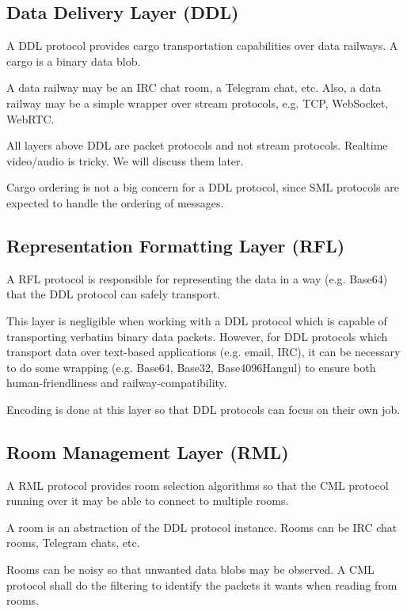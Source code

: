 \documentclass[a4paper,11pt]{article}
\begin{document}
\subsection{Data Delivery Layer (DDL)}

A DDL protocol provides cargo transportation capabilities over data railways.
A cargo is a binary data blob.

A data railway may be an IRC chat room, a Telegram chat, etc.
Also, a data railway may be a simple wrapper over stream protocols, e.g. TCP, WebSocket, WebRTC.

All layers above DDL are packet protocols and not stream protocols.
Realtime video/audio is tricky. We will discuss them later.

Cargo ordering is not a big concern for a DDL protocol, since SML protocols are expected to handle the ordering of messages.

\subsection{Representation Formatting Layer (RFL)}

A RFL protocol is responsible for representing the data in a way (e.g. Base64) that the DDL protocol can safely transport.

This layer is negligible when working with a DDL protocol which is capable of transporting verbatim binary data packets.
However, for DDL protocols which transport data over text-based applications (e.g. email, IRC),
it can be necessary to do some wrapping (e.g. Base64, Base32, Base4096Hangul) to ensure both human-friendliness and railway-compatibility.

Encoding is done at this layer so that DDL protocols can focus on their own job.

\subsection{Room Management Layer (RML)}

A RML protocol provides room selection algorithms so that the CML protocol running over it
may be able to connect to multiple rooms.

A room is an abstraction of the DDL protocol instance.
Rooms can be IRC chat rooms, Telegram chats, etc.

Rooms can be noisy so that unwanted data blobs may be observed.
A CML protocol shall do the filtering to identify the packets it wants when reading from rooms.
\end{document}
